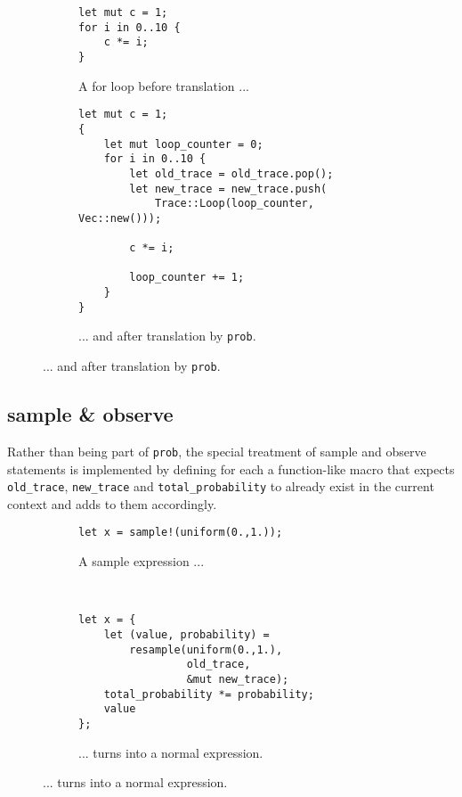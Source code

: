 \begin{figure}[H]
\begin{subfigure}{\textwidth}
\begin{lstlisting}
let mut c = 1;
for i in 0..10 {
    c *= i;
}
\end{lstlisting}
\caption{A for loop before translation ...}
\end{subfigure}

\begin{subfigure}{\textwidth}
\begin{lstlisting}
let mut c = 1;
{
    let mut loop_counter = 0;
    for i in 0..10 {
        let old_trace = old_trace.pop();
        let new_trace = new_trace.push(
            Trace::Loop(loop_counter, Vec::new()));

        c *= i;

        loop_counter += 1;
    }
}
\end{lstlisting}
\caption{... and after translation by \lstinline{prob}.}
\end{subfigure}
\end{figure}

\subsection{sample \& observe}

Rather than being part of \lstinline{prob}, the special treatment of sample and observe statements is implemented by defining for each a function-like macro that expects \lstinline{old_trace}, \lstinline{new_trace} and \lstinline{total_probability} to already exist in the current context and adds to them accordingly.

\begin{figure}[h]
\begin{subfigure}{0.5\textwidth}
\begin{lstlisting}
let x = sample!(uniform(0.,1.));
\end{lstlisting}
\caption{A sample expression ...}
\end{subfigure}
~
\begin{subfigure}{0.5\textwidth}
\begin{lstlisting}
let x = {
    let (value, probability) =
        resample(uniform(0.,1.), 
                 old_trace,
                 &mut new_trace);
    total_probability *= probability;
    value
};
\end{lstlisting}
\caption{... turns into a normal expression.}
\end{subfigure}
\end{figure}

